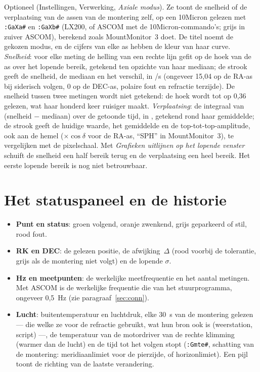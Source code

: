Optioneel (Instellingen, Verwerking, \emph{Axiale modus}). Ze toont de snelheid of
de verplaatsing van de assen van de montering zelf, op een 10Micron gelezen met
\texttt{:GaXa\#} en \texttt{:GaXb\#} (LX200, of ASCOM met de
10Micron-commando's; grijs in zuiver ASCOM), berekend zoals MountMonitor~3 doet.
De titel noemt de gekozen modus, en de cijfers van elke as hebben de kleur van haar curve. \emph{Snelheid}:
voor elke meting de helling van een rechte lijn gefit op de hoek van de as
over het lopende bereik, getekend ten opzichte van haar mediaan; de strook
geeft de snelheid, de mediaan en het verschil, in \arcsec/s (ongeveer 15,04
op de RA-as bij siderisch volgen, 0 op de DEC-as, polaire fout en refractie
terzijde). De snelheid tussen twee metingen wordt niet getekend: de hoek
wordt tot op 0,36\,\arcsec gelezen, wat haar honderd keer ruisiger maakt.
\emph{Verplaatsing}: de integraal van (snelheid $-$ mediaan) over de getoonde
tijd, in \arcsec, getekend rond haar gemiddelde; de strook geeft de huidige
waarde, het gemiddelde en de top-tot-top-amplitude, ook aan de hemel
($\times\cos\delta$ voor de RA-as, ``SPH'' in MountMonitor~3), te
vergelijken met de pixelschaal. Met \emph{Grafieken uitlijnen op het
lopende venster} schuift de snelheid een half bereik terug en de verplaatsing
een heel bereik. Het eerste lopende bereik is nog niet betrouwbaar.

\section{Het statuspaneel en de historie}
\label{sec:panel}

\begin{itemize}
  \item \textbf{Punt en status}: groen volgend, oranje zwenkend, grijs
  geparkeerd of stil, rood fout.
  \item \textbf{RK en DEC}: de gelezen positie, de afwijking~$\Delta$ (rood
  voorbij de tolerantie, grijs als de montering niet volgt) en de lopende
  $\sigma$.
  \item \textbf{Hz en meetpunten}: de werkelijke meetfrequentie en het aantal
  metingen. Met ASCOM is de werkelijke frequentie die van het stuurprogramma,
  ongeveer 0,5~Hz (zie paragraaf~\ref{sec:conn}).
  \item \textbf{Lucht}: buitentemperatuur en luchtdruk, elke 30~s van de
  montering gelezen --- die welke ze voor de refractie gebruikt, wat hun bron
  ook is (weerstation, script) ---, de temperatuur van de motordriver van de
  rechte klimming (warmer dan de lucht) en de tijd tot het volgen stopt (\texttt{:Gmte\#},
  schatting van de montering: meridiaanlimiet voor de pierzijde, of
  horizonlimiet). Een pijl toont de richting
  van de laatste verandering.
\end{itemize}

